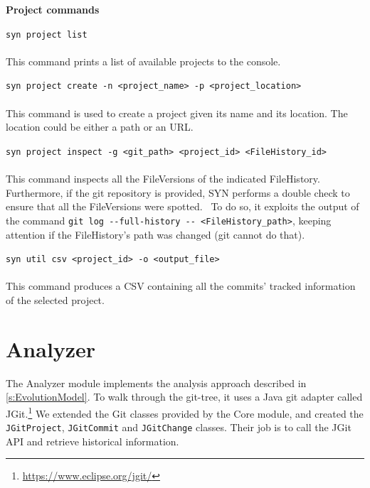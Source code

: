 \textbf{Project commands}


\lstinline{syn project list}\\
\\
This command prints a list of available projects to the console.


\lstinline{syn project create -n <project_name> -p <project_location>}\\
\\
This command is used to create a project given its name and its location. The location could be either a path or an URL. 


\lstinline{syn project inspect -g <git_path> <project_id> <FileHistory_id>}\\
\\
This command inspects all the FileVersions of the indicated FileHistory. Furthermore, if the git repository is provided, SYN performs a double check to ensure that all the FileVersions were spotted. \
To do so, it exploits the output of the command \lstinline{git log --full-history -- <FileHistory_path>}, keeping attention if the FileHistory's path was changed (git cannot do that).


\lstinline{syn util csv <project_id> -o <output_file>}\\
\\
This command produces a CSV containing all the commits' tracked information of the selected project. 


\section{Analyzer}
\label{sec:SYNAnalyzer}
The Analyzer module implements the analysis approach described in \autoref{s:EvolutionModel}.
To walk through the git-tree, it uses a Java git adapter called JGit.\footnote{\url{https://www.eclipse.org/jgit/}} 
We extended the Git classes provided by the Core module, and created the \texttt{JGitProject}, \texttt{JGitCommit} and \texttt{JGitChange} classes. Their job is to call the JGit API and retrieve historical information. 


